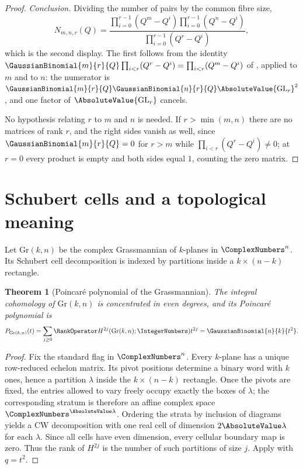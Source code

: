 \documentclass[11pt,a4paper,oneside,openany]{book}
\newtheorem{theorem}{Theorem}[chapter]
\theoremstyle{definition}
\theoremstyle{remark}
\begin{document}
\begin{proof}
\emph{Conclusion.}  Dividing the number of pairs by the common fibre size,
\[
 N_{m,n,r}(Q)
 =\frac{\prod_{i=0}^{r-1}(Q^m-Q^i)\prod_{i=0}^{r-1}(Q^n-Q^i)}
        {\prod_{i=0}^{r-1}(Q^r-Q^i)},
\]
which is the second display.  The first follows from the identity
$\GaussianBinomial{m}{r}{Q}\prod_{i<r}(Q^r-Q^i)=\prod_{i<r}(Q^m-Q^i)$ of
, applied to $m$ and to $n$: the numerator is
$\GaussianBinomial{m}{r}{Q}\GaussianBinomial{n}{r}{Q}\AbsoluteValue{\mathrm{GL}_r}^2$, and one
factor of $\AbsoluteValue{\mathrm{GL}_r}$ cancels.

No hypothesis relating $r$ to $m$ and $n$ is needed.  If $r>\min(m,n)$ there are no matrices of
rank $r$, and the right sides vanish as well, since $\GaussianBinomial{m}{r}{Q}=0$ for $r>m$ while
$\prod_{i<r}(Q^r-Q^i)\ne0$; at $r=0$ every product is empty and both sides equal $1$, counting the
zero matrix.
\end{proof}

\section{Schubert cells and a topological meaning}

Let $\mathrm{Gr}(k,n)$ be the complex Grassmannian of $k$-planes in $\ComplexNumbers^n$.  Its Schubert cell decomposition is indexed by partitions inside a $k\times(n-k)$ rectangle.

\begin{theorem}[Poincar\'e polynomial of the Grassmannian]\label{thm:grassmann-poincare}
The integral cohomology of $\mathrm{Gr}(k,n)$ is concentrated in even degrees, and its Poincar\'e polynomial is
\[
 P_{\mathrm{Gr}(k,n)}(t)
 =\sum_{j\ge0}\RankOperator H^{2j}(\mathrm{Gr}(k,n);\IntegerNumbers)t^{2j}
 =\GaussianBinomial{n}{k}{t^2}.
\]
\end{theorem}

\begin{proof}
Fix the standard flag in $\ComplexNumbers^n$.  Every $k$-plane has a unique row-reduced echelon matrix.  Its pivot positions determine a binary word with $k$ ones, hence a partition $\lambda$ inside the $k\times(n-k)$ rectangle.  Once the pivots are fixed, the entries allowed to vary freely occupy exactly the boxes of $\lambda$; the corresponding stratum is therefore an affine complex space $\ComplexNumbers^{\AbsoluteValue\lambda}$.  Ordering the strata by inclusion of diagrams yields a CW decomposition with one real cell of dimension $2\AbsoluteValue\lambda$ for each $\lambda$.  Since all cells have even dimension, every cellular boundary map is zero.  Thus the rank of $H^{2j}$ is the number of such partitions of size $j$.  Apply  with $q=t^2$.
\end{proof}
\end{document}
